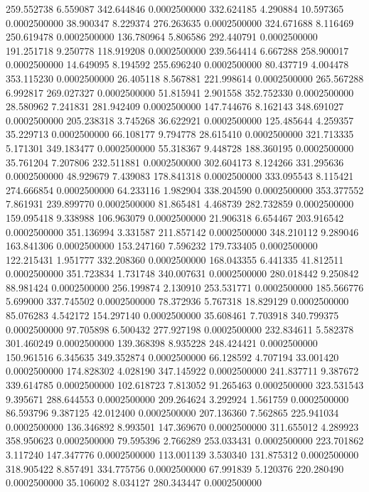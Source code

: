 259.552738 6.559087 342.644846 0.0002500000
332.624185 4.290884 10.597365 0.0002500000
38.900347 8.229374 276.263635 0.0002500000
324.671688 8.116469 250.619478 0.0002500000
136.780964 5.806586 292.440791 0.0002500000
191.251718 9.250778 118.919208 0.0002500000
239.564414 6.667288 258.900017 0.0002500000
14.649095 8.194592 255.696240 0.0002500000
80.437719 4.004478 353.115230 0.0002500000
26.405118 8.567881 221.998614 0.0002500000
265.567288 6.992817 269.027327 0.0002500000
51.815941 2.901558 352.752330 0.0002500000
28.580962 7.241831 281.942409 0.0002500000
147.744676 8.162143 348.691027 0.0002500000
205.238318 3.745268 36.622921 0.0002500000
125.485644 4.259357 35.229713 0.0002500000
66.108177 9.794778 28.615410 0.0002500000
321.713335 5.171301 349.183477 0.0002500000
55.318367 9.448728 188.360195 0.0002500000
35.761204 7.207806 232.511881 0.0002500000
302.604173 8.124266 331.295636 0.0002500000
48.929679 7.439083 178.841318 0.0002500000
333.095543 8.115421 274.666854 0.0002500000
64.233116 1.982904 338.204590 0.0002500000
353.377552 7.861931 239.899770 0.0002500000
81.865481 4.468739 282.732859 0.0002500000
159.095418 9.338988 106.963079 0.0002500000
21.906318 6.654467 203.916542 0.0002500000
351.136994 3.331587 211.857142 0.0002500000
348.210112 9.289046 163.841306 0.0002500000
153.247160 7.596232 179.733405 0.0002500000
122.215431 1.951777 332.208360 0.0002500000
168.043355 6.441335 41.812511 0.0002500000
351.723834 1.731748 340.007631 0.0002500000
280.018442 9.250842 88.981424 0.0002500000
256.199874 2.130910 253.531771 0.0002500000
185.566776 5.699000 337.745502 0.0002500000
78.372936 5.767318 18.829129 0.0002500000
85.076283 4.542172 154.297140 0.0002500000
35.608461 7.703918 340.799375 0.0002500000
97.705898 6.500432 277.927198 0.0002500000
232.834611 5.582378 301.460249 0.0002500000
139.368398 8.935228 248.424421 0.0002500000
150.961516 6.345635 349.352874 0.0002500000
66.128592 4.707194 33.001420 0.0002500000
174.828302 4.028190 347.145922 0.0002500000
241.837711 9.387672 339.614785 0.0002500000
102.618723 7.813052 91.265463 0.0002500000
323.531543 9.395671 288.644553 0.0002500000
209.264624 3.292924 1.561759 0.0002500000
86.593796 9.387125 42.012400 0.0002500000
207.136360 7.562865 225.941034 0.0002500000
136.346892 8.993501 147.369670 0.0002500000
311.655012 4.289923 358.950623 0.0002500000
79.595396 2.766289 253.033431 0.0002500000
223.701862 3.117240 147.347776 0.0002500000
113.001139 3.530340 131.875312 0.0002500000
318.905422 8.857491 334.775756 0.0002500000
67.991839 5.120376 220.280490 0.0002500000
35.106002 8.034127 280.343447 0.0002500000
